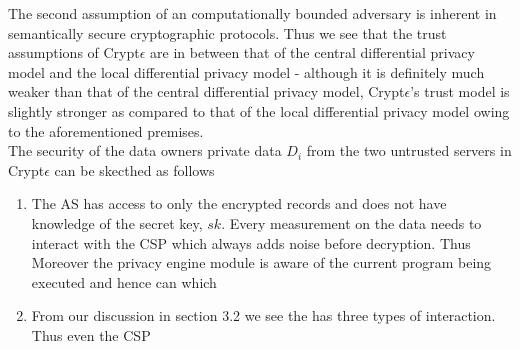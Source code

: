 The second assumption of an computationally bounded adversary is inherent in semantically secure cryptographic protocols. Thus we see that the trust assumptions of Crypt$\epsilon$ are in between that of the central differential privacy model and the local differential privacy model - although it is definitely much weaker than that of the central differential privacy model, Crypt$\epsilon$'s trust model is slightly stronger as compared to that of the local differential privacy model owing to the aforementioned premises. \\ The security of the data owners private data $D_i$ from the two untrusted servers in Crypt$\epsilon$  can be skecthed as follows \begin{enumerate}\item The AS has access to only the encrypted records and does not have knowledge of the secret key, $sk$. Every measurement on the data needs to interact with the \textsf{CSP} which always adds noise before decryption. Thus Moreover the privacy engine module is aware of the current program being executed and hence can which \item From our discussion in section 3.2 we see the has three types of interaction. Thus even the CSP\end{enumerate}
